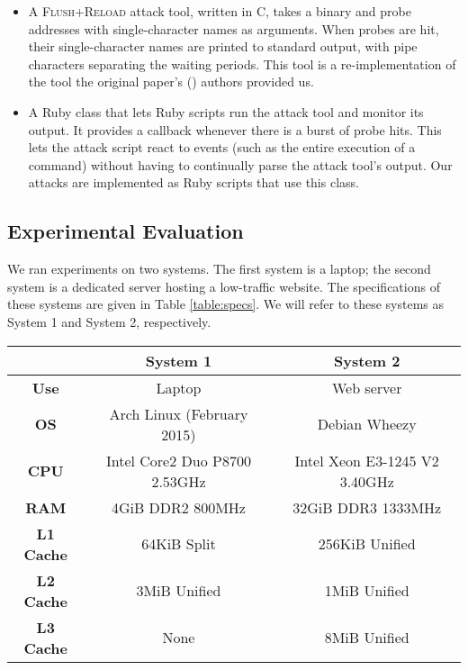 \documentclass[letterpaper,twocolumn,10pt]{article}
\begin{document}
\begin{itemize}
    \item A \textsc{Flush+Reload} attack tool, written in C, takes a binary and probe
        addresses with single-character names as arguments. When probes are hit,
        their single-character names are printed to standard output, with pipe
        characters separating the waiting periods. This tool is
        a re-implementation of the tool the original paper's
        (\cite{yarom2013flush}) authors provided us.

    \item A Ruby class that lets Ruby scripts run the attack tool and monitor
        its output. It provides a callback whenever there is a burst of probe
        hits. This lets the attack script react to events (such as the entire
        execution of a command) without having to continually parse the attack
        tool's output. Our attacks are implemented as Ruby scripts that use this
        class.
\end{itemize}

\subsection{Experimental Evaluation}

We ran experiments on two systems. The first system is a laptop; the second
system is a dedicated server hosting a low-traffic website. The specifications
of these systems are given in Table \ref{table:specs}. We will refer to these
systems as System 1 and System 2, respectively.

\begin{table*}
    \centering
\begin{tabular}{|c|c|c|}
    \hline
    & \textbf{System 1} & \textbf{System 2} \\
    \hline
    \textbf{Use} & Laptop & Web server \\
    \hline
    \textbf{OS} & Arch Linux (February 2015) & Debian Wheezy \\
    \hline
    \textbf{CPU} & Intel Core2 Duo P8700 2.53GHz & Intel Xeon E3-1245 V2 3.40GHz  \\
    \hline
    \textbf{RAM} & 4GiB DDR2 800MHz & 32GiB DDR3 1333MHz \\
    \hline
    \textbf{L1 Cache} & 64KiB Split & 256KiB Unified \\
    \hline
    \textbf{L2 Cache} & 3MiB Unified & 1MiB Unified \\
    \hline
    \textbf{L3 Cache} & None & 8MiB Unified \\
    \hline
\end{tabular}
\caption{System specifications. Cache specifications were obtained by the
\texttt{dmidecode} utility and may not be accurate. System 1 does not have a L3
cache, but FLUSH+RELOAD works with its L2 cache as it is shared between cores.}
\label{table:specs}
\end{table*}
\end{document}
